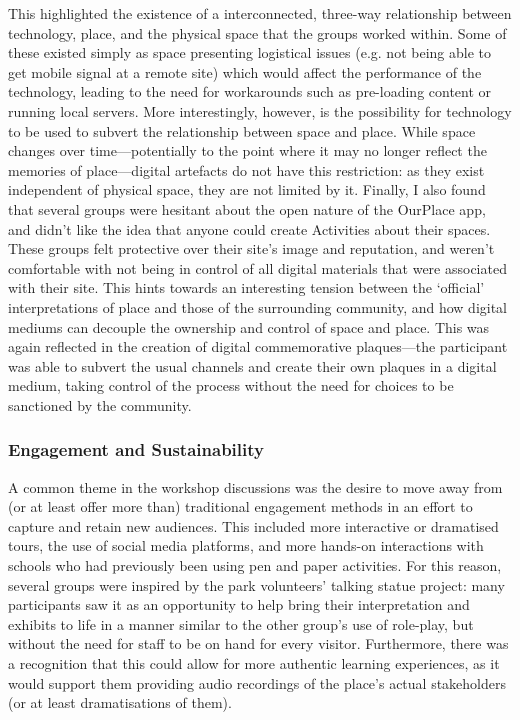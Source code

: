 This highlighted the existence of a interconnected, three-way relationship between technology, place, and the physical space that the groups worked within. Some of these existed simply as space presenting logistical issues (e.g. not being able to get mobile signal at a remote site) which would affect the performance of the technology, leading to the need for workarounds such as pre-loading content or running local servers. More interestingly, however, is the possibility for technology to be used to subvert the relationship between space and place. While space changes over time---potentially to the point where it may no longer reflect the memories of place---digital artefacts do not have this restriction: as they exist independent of physical space, they are not limited by it. Finally, I also found that several groups were hesitant about the open nature of the OurPlace app, and didn't like the idea that anyone could create Activities about their spaces. These groups felt protective over their site's image and reputation, and weren't comfortable with not being in control of all digital materials that were associated with their site. This hints towards an interesting tension between the `official' interpretations of place and those of the surrounding community, and how digital mediums can decouple the ownership and control of space and place. This was again reflected in the creation of digital commemorative plaques---the participant was able to subvert the usual channels and create their own plaques in a digital medium, taking control of the process without the need for choices to be sanctioned by the community.  

\subsubsection{Engagement and Sustainability}

A common theme in the workshop discussions was the desire to move away from (or at least offer more than) traditional engagement methods in an effort to capture and retain new audiences. This included more interactive or dramatised tours, the use of social media platforms, and more hands-on interactions with schools who had previously been using pen and paper activities. For this reason, several groups were inspired by the park volunteers' talking statue project: many participants saw it as an opportunity to help bring their interpretation and exhibits to life in a manner similar to the other group's use of role-play, but without the need for staff to be on hand for every visitor. Furthermore, there was a recognition that this could allow for more authentic learning experiences, as it would support them providing audio recordings of the place's actual stakeholders (or at least dramatisations of them).

